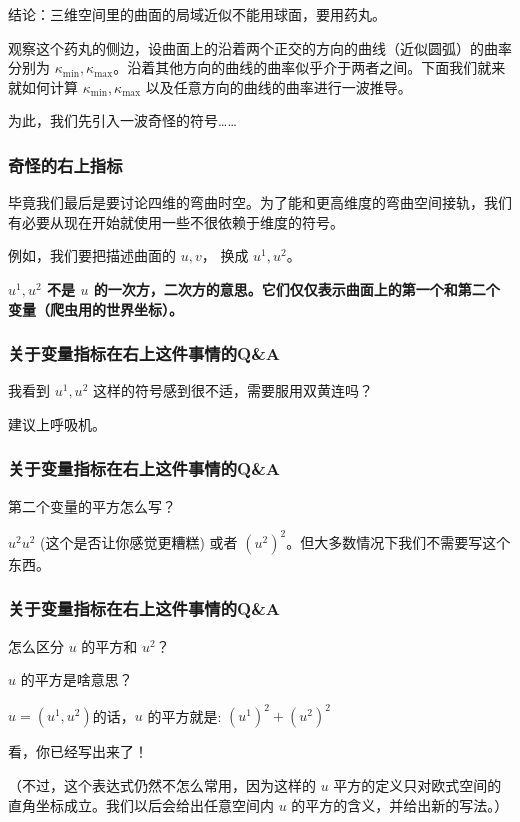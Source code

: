 \documentclass[CJK,13pt]{beamer}
\begin{document}
\begin{frame}

  结论：三维空间里的曲面的局域近似不能用球面，要用药丸。


  观察这个药丸的侧边，设曲面上的沿着两个正交的方向的曲线（近似圆弧）的曲率分别为
  $\kappa_{\min}, \kappa_{\max}$。沿着其他方向的曲线的曲率似乎介于两者之间。下面我们就来就如何计算 $\kappa_{\min}, \kappa_{\max}$ 以及任意方向的曲线的曲率进行一波推导。

  为此，我们先引入一波奇怪的符号……
\end{frame}



\begin{frame}
  \frametitle{奇怪的右上指标}
  毕竟我们最后是要讨论四维的弯曲时空。为了能和更高维度的弯曲空间接轨，我们有必要从现在开始就使用一些不很依赖于维度的符号。

  \skipline

  例如，我们要把描述曲面的 $u, v$， 换成 $u^1, u^2$。


  
 {\bf $u^1, u^2$ 不是 $u$ 的一次方，二次方的意思。它们仅仅表示曲面上的第一个和第二个变量（爬虫用的世界坐标）。}

\end{frame}


\begin{frame}
  \frametitle{关于变量指标在右上这件事情的Q\&A}
  \question 我看到 $u^1, u^2$ 这样的符号感到很不适，需要服用双黄连吗？
  
  \answer 建议上呼吸机。
\end{frame}


\begin{frame}
  \frametitle{关于变量指标在右上这件事情的Q\&A}
  \question 第二个变量的平方怎么写？
  
  \answer $u^2u^2$ (这个是否让你感觉更糟糕\huaixiao) 或者 $\left(u^2\right)^2$。但大多数情况下我们不需要写这个东西。
\end{frame}


\begin{frame}
  \frametitle{关于变量指标在右上这件事情的Q\&A}
  \question 怎么区分 $u$ 的平方和 $u^2$？
  
  \answer $u$ 的平方是啥意思？

  \question $u = (u^1, u^2)$的话，$u$ 的平方就是: $ (u^1)^2+(u^2)^2$

  \answer 看，你已经写出来了！

  （不过，这个表达式仍然不怎么常用，因为这样的 $u$ 平方的定义只对欧式空间的直角坐标成立。我们以后会给出任意空间内 $u$ 的平方的含义，并给出新的写法。）
\end{frame}
\end{document}
